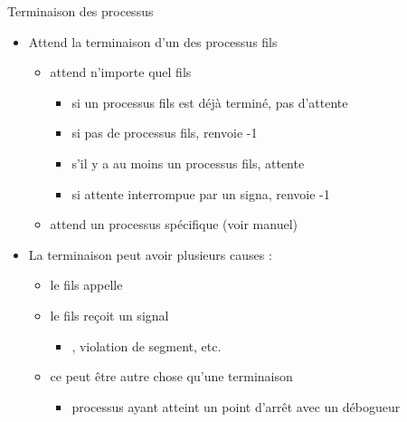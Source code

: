 \begin {frame} {Terminaison des processus}

    \vspace* {-8mm}

    \begin {itemize}
	\item Attend la terminaison d'un des processus fils
	    \begin {itemize}
		\item {} attend n'importe quel fils
		    \begin {itemize}
			\item si un processus fils est déjà terminé,
			    pas d'attente
			\item si pas de processus fils, renvoie -1
			\item s'il y a au moins un processus fils, attente
			\item si attente interrompue par un signa, renvoie -1
		    \end {itemize}
		\item {} attend un processus spécifique
		    (voir manuel)
	    \end {itemize}
	\item La terminaison peut avoir plusieurs causes :
	    \begin {itemize}
		\item le fils appelle 
		\item le fils reçoit un signal
		    \begin {itemize}
			\item {} , violation
			    de segment, etc.
		    \end {itemize}
		\item ce peut être autre chose qu'une terminaison
		    \begin {itemize}
			\item processus ayant atteint un point d'arrêt avec
			    un débogueur
		    \end {itemize}

	    \end {itemize}
    \end {itemize}
\end {frame}

